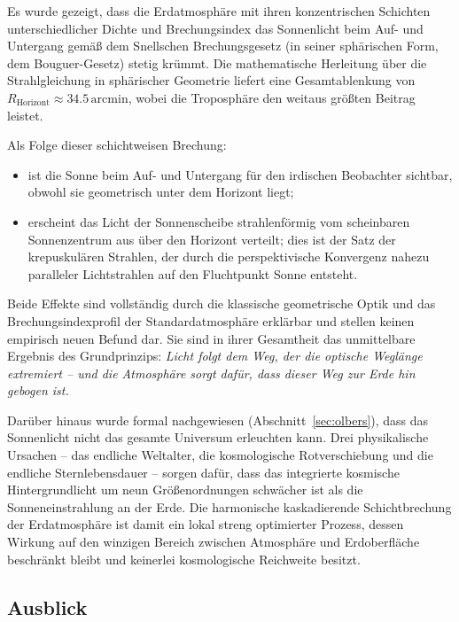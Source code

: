 \documentclass[12pt,a4paper]{article}
\providecommand{\ang}[1]{\ensuremath{#1\,\mathrm{arcmin}}}
\begin{document}
Es wurde gezeigt, dass die Erdatmosphäre mit ihren konzentrischen
Schichten unterschiedlicher Dichte und Brechungsindex das Sonnenlicht
beim Auf- und Untergang gemäß dem Snellschen Brechungsgesetz
(in seiner sphärischen Form, dem Bouguer-Gesetz) stetig krümmt.
Die mathematische Herleitung über die Strahlgleichung in
sphärischer Geometrie liefert eine Gesamtablenkung von
$R_{\mathrm{Horizont}} \approx \ang{34.5}$,
wobei die Troposphäre den weitaus größten Beitrag leistet.

Als Folge dieser schichtweisen Brechung:
\begin{itemize}
  \item ist die Sonne beim Auf- und Untergang für den irdischen
        Beobachter sichtbar, obwohl sie geometrisch un\-ter dem
        Horizont liegt;
  \item erscheint das Licht der Sonnenscheibe strahlenförmig
        vom scheinbaren Sonnenzentrum aus über den Horizont
        verteilt; dies ist der Satz der krepuskulären Strahlen,
        der durch die perspektivische Konvergenz nahezu paralleler
        Lichtstrahlen auf den Fluchtpunkt Sonne entsteht.
\end{itemize}

Beide Effekte sind vollständig durch die klassische geometrische Optik
und das Brechungsindexprofil der Standardatmosphäre erklärbar
und stellen keinen empirisch neuen Befund dar.
Sie sind in ihrer Gesamtheit das unmittelbare Ergebnis des
Grundprinzips: \emph{Licht folgt dem Weg, der die optische
Weglänge extremiert -- und die Atmosphäre sorgt dafür, dass dieser
Weg zur Erde hin gebogen ist.}

Darüber hinaus wurde formal nachgewiesen (Abschnitt~\ref{sec:olbers}),
dass das Sonnenlicht nicht das gesamte Universum erleuchten kann.
Drei physikalische Ursachen -- das endliche Weltalter, die
kosmologische Rotverschiebung und die endliche Sternlebensdauer --
sorgen dafür, dass das integrierte kosmische Hintergrundlicht
um neun Größenordnungen schwächer ist als die Sonneneinstrahlung
an der Erde.
Die harmonische kaskadierende Schichtbrechung der Erdatmosphäre
ist damit ein lokal streng optimierter Prozess, dessen Wirkung
auf den winzigen Bereich zwischen Atmosphäre und Erdoberfläche
beschränkt bleibt und keinerlei kosmologische Reichweite besitzt.

\subsection{Ausblick}
\end{document}
